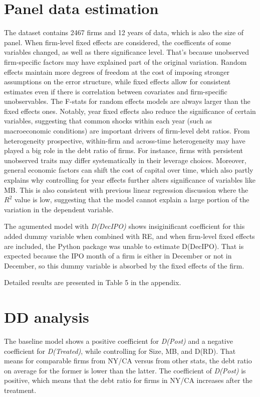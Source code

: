 \documentclass{article}
\begin{document}
\section*{Panel data estimation}
The dataset contains 2467 firms and 12 years of data, which is also the size of panel.
When firm-level fixed effects are considered, the coefficents of some variables changed, as well as there significance level.
That's because unobserved firm-specific factors may have explained part of the original variation.
Random effects maintain more degrees of freedom at the cost of imposing stronger assumptions on the error
structure, while fixed effects allow for consistent estimates even if there is
correlation between covariates and firm-specific unobservables. The F-stats for random effects models are always larger
than the fixed effects ones.
Notably, year fixed effects also reduce the significance of certain variables, suggesting that common shocks within each year (such as macroeconomic conditions)
are important drivers of firm-level debt ratios. From heterogeneity prospective,  within-firm and across-time heterogeneity
may have played a big role in the debt ratio of firms. For instance, firms with persistent unobserved traits
may differ systematically in their leverage choices. Moreover, general economic factors can shift the
cost of capital over time, which also partly explains why controlling for year effects further alters significance of variables like MB.
This is also consistent with previous linear regression discussion where the $R^2$ value is low, suggesting that the model
cannot explain a large portion of the variation in the dependent variable.

The agumented model with \textit{D(DecIPO)} shows insiginificant coefficient for this added dummy variable when combined with RE,
and when firm-level fixed effects are included, the Python package was unable to estimate D(DecIPO).
That is expected because the IPO month of a firm is either in December or not in December, so
this dummy variable is absorbed by the fixed effects of the firm.

Detailed results are presented in Table 5 in the appendix.

\section*{DD analysis}
The baseline model shows a positive coefficient for \textit{D(Post)} and a negative coefficient for
\textit{D(Treated)}, while controlling for Size, MB, and D(RD). That means for comparable firms from NY/CA versus from other
stats, the debt ratio on average for the former is lower than the latter. The coefficient of \textit{D(Post)} is
positive, which means that the debt ratio for firms in NY/CA increases after the treatment.
\end{document}
